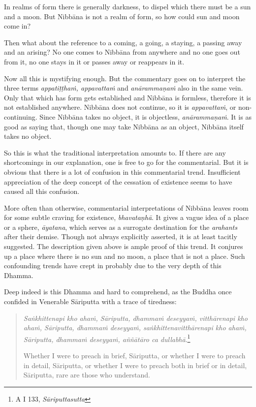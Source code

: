 In realms of form there is generally darkness, to dispel which there must be a sun and a moon. But Nibbāna is not a realm of form, so how could sun and moon come in?

Then what about the reference to a coming, a going, a staying, a passing away and an arising? No one comes to Nibbāna from anywhere and no one goes out from it, no one stays in it or passes away or reappears in it.

Now all this is mystifying enough. But the commentary goes on to interpret the three terms \emph{appatiṭṭhaṁ, appavattaṁ} and \emph{anārammaṇaṁ} also in the same vein. Only that which has form gets established and Nibbāna is formless, therefore it is not established anywhere. Nibbāna does not continue, so it is \emph{appavattaṁ}, or non-continuing. Since Nibbāna takes no object, it is objectless, \emph{anārammaṇaṁ}. It is as good as saying that, though one may take Nibbāna as an object, Nibbāna itself takes no object.

So this is what the traditional interpretation amounts to. If there are any shortcomings in our explanation, one is free to go for the commentarial. But it is obvious that there is a lot of confusion in this commentarial trend. Insufficient appreciation of the deep concept of the cessation of existence seems to have caused all this confusion.

More often than otherwise, commentarial interpretations of Nibbāna leaves room for some subtle craving for existence, \emph{bhavataṇhā}. It gives a vague idea of a place or a sphere, \emph{āyatana}, which serves as a surrogate destination for the \emph{arahants} after their demise. Though not always explicitly asserted, it is at least tacitly suggested. The description given above is ample proof of this trend. It conjures up a place where there is no sun and no moon, a place that is not a place. Such confounding trends have crept in probably due to the very depth of this Dhamma.

Deep indeed is this Dhamma and hard to comprehend, as the Buddha once confided in Venerable Sāriputta with a trace of tiredness:

\begin{quote}
\emph{Saṅkhittenapi kho ahaṁ, Sāriputta, dhammaṁ deseyyaṁ, vitthārenapi kho ahaṁ, Sāriputta, dhammaṁ deseyyaṁ, saṅkhittenavitthārenapi kho ahaṁ, Sāriputta, dhammaṁ deseyyaṁ, aññātāro ca dullabhā}.\footnote{A I 133, \emph{Sāriputtasutta}}

Whether I were to preach in brief, Sāriputta, or whether I were to preach in detail, Sāriputta, or whether I were to preach both in brief or in detail, Sāriputta, rare are those who understand.
\end{quote}

